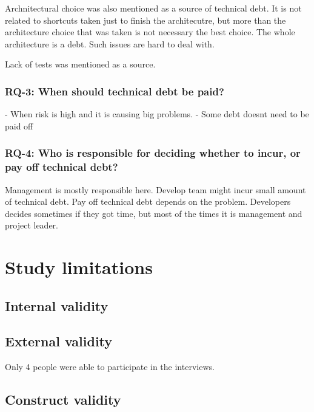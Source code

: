 Archnitectural choice was also mentioned as a source of technical debt. It is not related to shortcuts taken just to finish the architecutre, but more than the architecture choice that was taken is not necessary the best choice. The whole architecture is a debt. Such issues are hard to deal with.

Lack of tests was mentioned as a source.


\subsubsection{RQ-3: When should technical debt be paid?}
- When risk is high and it is causing big problems.
- Some debt doesnt need to be paid off

\subsubsection{RQ-4: Who is responsible for deciding whether to incur, or pay off technical debt?}

 Management is mostly responsible here. Develop team might incur small amount of technical debt. Pay off technical debt depends on the problem. Developers decides sometimes if they got time, but most of the times it is management and project leader.

\section{Study limitations}

\subsection{Internal validity}


\subsection{External validity}
Only 4 people were able to participate in the interviews. 

\subsection{Construct validity}

